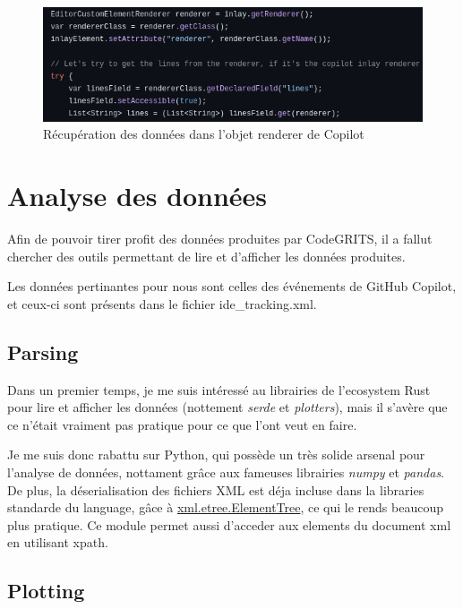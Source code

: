 \begin{figure}
  \centering
  \includegraphics[width=15cm]{images/getting-the-lines.png}
  \caption{Récupération des données dans l'objet renderer de Copilot}
  \label{getting-the-lines}
\end{figure}


\newpage
\section{Analyse des données}

Afin de pouvoir tirer profit des données produites par CodeGRITS, il a fallut chercher des outils permettant de lire et d'afficher les données produites.

Les données pertinantes pour nous sont celles des événements de GitHub Copilot, et ceux-ci sont présents dans le fichier ide\_tracking.xml.

\subsection{Parsing}

Dans un premier temps, je me suis intéressé au librairies de l'ecosystem Rust pour lire et afficher les données (nottement \emph{serde} et \emph{plotters}),
mais il s'avère que ce n'était vraiment pas pratique pour ce que l'ont veut en faire.

Je me suis donc rabattu sur Python, qui possède un très solide arsenal pour l'analyse de données, nottament grâce aux fameuses librairies \emph{numpy} et \emph{pandas}.
De plus, la déserialisation des fichiers XML est déja incluse dans la libraries standarde du language, gâce à \href{https://docs.python.org/3/library/xml.etree.elementtree.html}{xml.etree.ElementTree},
ce qui le rends beaucoup plus pratique.
Ce module permet aussi d'acceder aux elements du document xml en utilisant xpath.

\subsection{Plotting}

